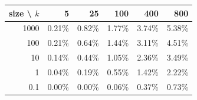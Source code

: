 \begin{tabular}{|r|r|r|r|r|r|}
\hline
\rowcolor{gray!15}size \textbackslash{} $k$ & 5 & 25 & 100 & 400 & 800 \\
\hline
1000 & 0.21\% & 0.82\% & 1.77\% & 3.74\% & 5.38\% \\
\hline
100 & 0.21\% & 0.64\% & 1.44\% & 3.11\% & 4.51\% \\
\hline
10 & 0.14\% & 0.44\% & 1.05\% & 2.36\% & 3.49\% \\
\hline
1 & 0.04\% & 0.19\% & 0.55\% & 1.42\% & 2.22\% \\
\hline
0.1 & 0.00\% & 0.00\% & 0.06\% & 0.37\% & 0.73\% \\
\hline
\end{tabular}
